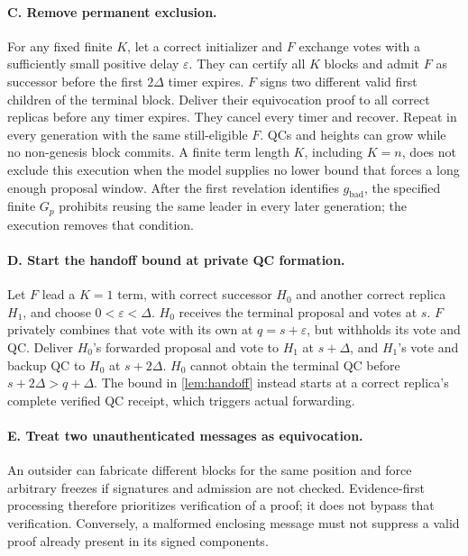 \documentclass[11pt,a4paper]{article}
\begin{document}
\paragraph{C. Remove permanent exclusion.}
For any fixed finite $K$, let a correct initializer and $F$ exchange votes
with a sufficiently small positive delay $\varepsilon$. They can certify
all $K$ blocks and admit $F$ as successor before the first $2\Delta$
timer expires. $F$ signs two different valid first children of the terminal
block. Deliver their equivocation proof to all correct replicas before
any timer expires. They cancel every timer and recover. Repeat in every
generation with the same still-eligible $F$. QCs and heights can grow
while no non-genesis block commits. A finite term length $K$,
including $K=n$, does not exclude this execution when the model supplies
no lower bound that forces a long enough proposal window. After the first
revelation identifies $g_{\mathrm{bad}}$, the specified finite $G_p$
prohibits reusing the same leader in every later generation; the
execution removes that condition.

\paragraph{D. Start the handoff bound at private QC formation.}
Let $F$ lead a $K=1$ term, with correct successor $H_0$ and another correct
replica $H_1$, and choose $0<\varepsilon<\Delta$.
$H_0$ receives the terminal proposal and votes at $s$.
$F$ privately combines that vote with its own at $q=s+\varepsilon$,
but withholds its vote and QC. Deliver $H_0$'s forwarded proposal and vote
to $H_1$ at $s+\Delta$, and $H_1$'s vote and backup QC to $H_0$ at
$s+2\Delta$.
$H_0$ cannot obtain the terminal QC before $s+2\Delta>q+\Delta$.
The bound in \cref{lem:handoff} instead starts at a correct replica's
complete verified QC receipt, which triggers actual forwarding.

\paragraph{E. Treat two unauthenticated messages as equivocation.}
An outsider can fabricate different blocks for the same position and
force arbitrary freezes if signatures and admission are not checked.
Evidence-first processing therefore prioritizes verification of a proof;
it does not bypass that verification. Conversely, a malformed enclosing
message must not suppress a valid proof already present in its signed
components.
\end{document}
